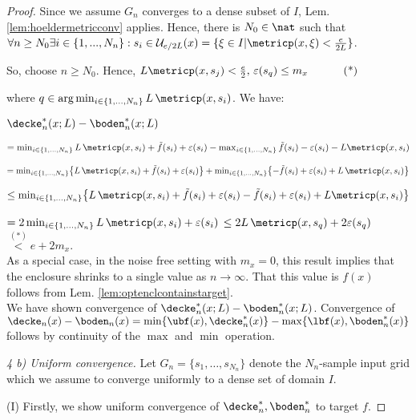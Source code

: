 \begin{thm}
\begin{proof}
Since we assume $G_n$ converges to a dense subset of $I$, Lem. \ref{lem:hoeldermetricconv} applies. Hence, there is $N_0 \in \nat$ such that $\forall n \geq N_0 \exists i \in \{1,...,N_n\}: s_i \in \mathcal U_{e/2L}(x) = \{\xi \in I | \metricp(x,\xi) < \frac{e}{2L}\}$.
 
So, choose $n \geq N_0$. 
Hence, $L \metricp(x,s_j)  < \frac{e}{2}, \,\varepsilon(s_q) \leq m_x \hspace{1cm} \text{ (*)}$ 

where 
$q \in \arg\min_{i \in \{1,...,N_n\} } L \, \metricp(x,s_i) $. 
We have:

 $\decke_n^*(x;L) - \boden_n^*(x;L)$ 

$= \min_{i \in \{1,...,N_n\} } L \, \metricp(x,s_i) + \tilde f(s_i) + \varepsilon(s_i) - \max_{i \in \{1,...,N_n\} }  \tilde f(s_i) - \varepsilon(s_i) - L \metricp(x,s_i) $

$= \min_{i \in \{1,...,N_n\} } \bigl\{L \, \metricp(x,s_i) + \tilde f(s_i) + \varepsilon(s_i) \bigr\}+ \min_{i \in \{1,...,N_n\} }  \bigl\{-\tilde f(s_i) + \varepsilon(s_i)+ L \, \metricp(x,s_i)\bigr\} $

$\leq \min_{i \in \{1,...,N_n\} } \bigl\{L \, \metricp(x,s_i) + \tilde f(s_i) + \varepsilon(s_i)    -\tilde f(s_i) + \varepsilon(s_i)+ L \metricp(x,s_i) \bigr\}$

$=2\min_{i \in \{1,...,N_n\} } L \, \metricp(x,s_i) + \varepsilon(s_i) $
$\leq 2 L \, \metricp(x,s_q)+ 2\varepsilon(s_q) $
$\stackrel{(*)}{<} e + 2 m_x  $.\\
As a special case, in the noise free setting with  $m_x=0$, this result implies that the enclosure shrinks to a single value as $n \to \infty$. That this value is $f(x)$ follows from Lem. \ref{lem:optenclcontainstarget}.  \\

We have shown convergence of $\decke_n^*(x;L) - \boden_n^*(x;L)$. Convergence of $\decke_n(x) - \boden_n(x) = \min\{\ubf(x), \decke_n^*(x)\} - \max\{\lbf(x),\boden_n^*(x)\}$ follows by continuity of the $\max$ and $\min$ operation.


 \textit{4 b) Uniform convergence.}
Let $G_n = \{s_1,\ldots,s_{N_n}\}$ denote the $N_n$-sample input grid which we assume to converge uniformly to a dense set of domain $I$. 


(I) Firstly, we show uniform convergence of $\decke_n^*, \boden_n^*$ to target $f$.


\end{proof}
\end{thm}
